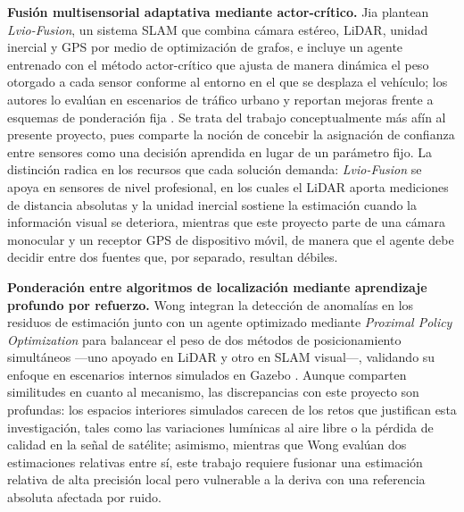 \textbf{Fusión multisensorial adaptativa mediante actor-crítico.} Jia \etal{} plantean \textit{Lvio-Fusion}, un sistema SLAM que combina cámara estéreo, LiDAR, unidad inercial y GPS por medio de optimización de grafos, e incluye un agente entrenado con el método actor-crítico que ajusta de manera dinámica el peso otorgado a cada sensor conforme al entorno en el que se desplaza el vehículo; los autores lo evalúan en escenarios de tráfico urbano y reportan mejoras frente a esquemas de ponderación fija \cite{jia2021lviofusion}.
Se trata del trabajo conceptualmente más afín al presente proyecto, pues comparte la noción de concebir la asignación de confianza entre sensores como una decisión aprendida en lugar de un parámetro fijo.
La distinción radica en los recursos que cada solución demanda: \textit{Lvio-Fusion} se apoya en sensores de nivel profesional, en los cuales el LiDAR aporta mediciones de distancia absolutas y la unidad inercial sostiene la estimación cuando la información visual se deteriora, mientras que este proyecto parte de una cámara monocular y un receptor GPS de dispositivo móvil, de manera que el agente debe decidir entre dos fuentes que, por separado, resultan débiles.
 
\textbf{Ponderación entre algoritmos de localización mediante aprendizaje profundo por refuerzo.} Wong \etal{} integran la detección de anomalías en los residuos de estimación junto con un agente optimizado mediante \textit{Proximal Policy Optimization} para balancear el peso de dos métodos de posicionamiento simultáneos —uno apoyado en LiDAR y otro en SLAM visual—, validando su enfoque en escenarios internos simulados en Gazebo \cite{wong2024drlslam}.
Aunque comparten similitudes en cuanto al mecanismo, las discrepancias con este proyecto son profundas: los espacios interiores simulados carecen de los retos que justifican esta investigación, tales como las variaciones lumínicas al aire libre o la pérdida de calidad en la señal de satélite; asimismo, mientras que Wong \etal{} evalúan dos estimaciones relativas entre sí, este trabajo requiere fusionar una estimación relativa de alta precisión local pero vulnerable a la deriva con una referencia absoluta afectada por ruido.

